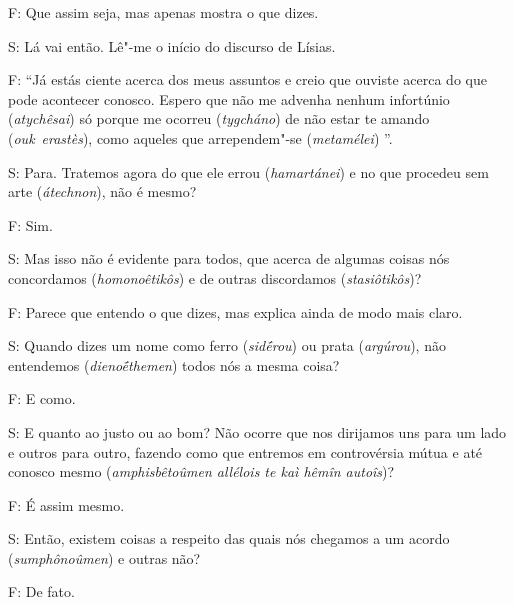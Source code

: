 F: Que assim seja, mas apenas mostra o que dizes.

S: Lá vai então. Lê"-me o início do discurso de Lísias.

 

\bekker{[262e]} F: ``Já estás ciente acerca dos meus assuntos e creio que
ouviste acerca do que pode acontecer conosco. Espero que não me advenha
nenhum infortúnio (\emph{atychêsai}) só porque me ocorreu
(\emph{tygcháno}) de não estar te amando (\emph{ouk}~\emph{erastès}),
como aqueles que \redondo{[…]} arrependem"-se (\emph{metamélei})
\redondo{[…]}''.

S: Para. Tratemos agora do que ele errou (\emph{hamartánei}) e no que
procedeu sem arte (\emph{átechnon}), não é mesmo?

\bekker{[263a]} F: Sim.

 

S: Mas isso não é evidente para todos, que acerca de algumas coisas nós
concordamos (\emph{homonoêtikôs}) e de outras discordamos
(\emph{stasiôtikôs})?

 
F: Parece que entendo o que dizes, mas explica ainda de modo mais claro.

 

S: Quando dizes um nome como ferro (\emph{sidḗrou}) ou prata
(\emph{argúrou}), não entendemos (\emph{dienoḗthemen}) todos nós a mesma
coisa?

F: E como.

 

S: E quanto ao justo ou ao bom? Não ocorre que nos dirijamos uns para um
lado e outros para outro, fazendo como que entremos em controvérsia
mútua e até conosco mesmo (\emph{amphisbêtoûmen allélois te kaì hêmîn
autoîs})?

 

F: É assim mesmo.

 

\bekker{[263b]} S: Então, existem coisas a respeito das quais nós chegamos a
um acordo (\emph{sumphônoûmen}) e outras não?

 

F: De fato.

